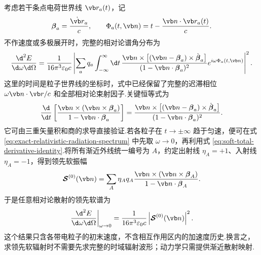 考虑若干条点电荷世界线 $\vb r_a(t)$，记
\begin{equation}
 \boldsymbol\beta_a=\frac{\dot{\vb r}_a}{c},
 \qquad
 \Phi_a(t,\vb n)=t-\frac{\vb n\cdot\vb r_a(t)}{c}.
\end{equation}
不作速度或多极展开时，完整的相对论谱角分布为
\begin{equation}
 \frac{\d^2E}{\d\omega\d\Omega}
 =\frac{1}{16\pi^3\varepsilon_0c}
 \left|
 \sum_a q_a\int_{-\infty}^{\infty}\d t\,
 \frac{\vb n\times\left[(\vb n-\boldsymbol\beta_a)\times\dot{\boldsymbol\beta}_a\right]}
 {(1-\vb n\cdot\boldsymbol\beta_a)^2}
 e^{i\omega\Phi_a(t,\vb n)}
 \right|^2.
 \label{eq:exact-relativistic-radiation-spectrum}
\end{equation}
这里的时间是粒子世界线的坐标时，式中已经保留了完整的迟滞相位 $\omega\vb n\cdot\vb r/c$ 和全部相对论束射因子.关键恒等式为
\begin{equation}
 \frac{\d}{\d t}
 \left[
 \frac{\vb n\times(\vb n\times\boldsymbol\beta_a)}
 {1-\vb n\cdot\boldsymbol\beta_a}
 \right]
 =
 \frac{\vb n\times\left[(\vb n-\boldsymbol\beta_a)\times\dot{\boldsymbol\beta}_a\right]}
 {(1-\vb n\cdot\boldsymbol\beta_a)^2}.
 \label{eq:soft-total-derivative-identity}
\end{equation}
它可由三重矢量积和商的求导直接验证.若各粒子在 $t\to\pm\infty$ 趋于匀速，便可在式 \eqref{eq:exact-relativistic-radiation-spectrum} 中先取 $\omega\to0$，再利用式 \eqref{eq:soft-total-derivative-identity}.将所有渐近外线统一编号为 $A$，约定出射线 $\eta_A=+1$、入射线 $\eta_A=-1$，得到领先软振幅
\begin{equation}
 \boldsymbol{\mathcal S}^{(0)}(\vb n)
 =\sum_A\eta_Aq_A
 \frac{\vb n\times(\vb n\times\boldsymbol\beta_A)}
 {1-\vb n\cdot\boldsymbol\beta_A}.
 \label{eq:classical-leading-soft-factor}
\end{equation}
于是任意相对论散射的领先软谱为
\begin{equation}
 \left.\frac{\d^2E}{\d\omega\d\Omega}\right|_{\omega\to0}
 =\frac{1}{16\pi^3\varepsilon_0c}
 \left|\boldsymbol{\mathcal S}^{(0)}(\vb n)\right|^2.
 \label{eq:relativistic-soft-angular-spectrum}
\end{equation}
这个结果只含各带电粒子的初末速度，不含相互作用区内的加速度历史.换言之，求领先软辐射时不需要先求完整的时域辐射波形；动力学只需提供渐近散射映射.

